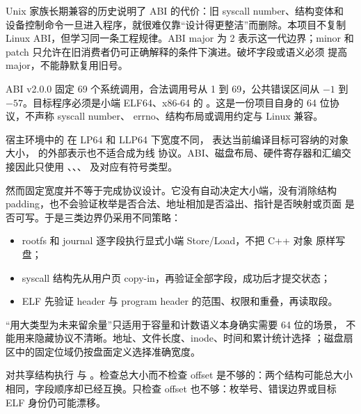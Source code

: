 Unix 家族长期兼容的历史说明了 ABI 的代价：旧 syscall number、结构变体和
设备控制命令一旦进入程序，就很难仅靠“设计得更整洁”而删除。本项目不复制
Linux ABI，但学习同一条工程规律。ABI major 为 2 表示这一代边界；minor
和 patch 只允许在旧消费者仍可正确解释的条件下演进。破坏字段或语义必须
提高 major，不能静默复用旧号。

\begin{contractbox}
ABI v2.0.0 固定 69 个系统调用，合法调用号从 1 到 69，公共错误区间从
\(-1\) 到 \(-57\)。目标程序必须是小端 ELF64、x86-64 的
。这是一份项目自身的 64 位协议，不声称 syscall number、
errno、结构布局或调用约定与 Linux 兼容。
\end{contractbox}

宿主环境中的  在 LP64 和 LLP64 下宽度不同，
表达当前编译目标可容纳的对象大小， 的外部表示也不适合成为线
协议。ABI、磁盘布局、硬件寄存器和汇编交接因此只使用
、、、
 及对应有符号类型。

然而固定宽度并不等于完成协议设计。它没有自动决定大小端，没有消除结构
padding，也不会验证枚举是否合法、地址相加是否溢出、指针是否映射或页面
是否可写。于是三类边界仍采用不同策略：

\begin{itemize}[leftmargin=2em]
  \item rootfs 和 journal 逐字段执行显式小端 Store/Load，不把 C++ 对象
        原样写盘；
  \item syscall 结构先从用户页 copy-in，再验证全部字段，成功后才提交状态；
  \item ELF 先验证 header 与 program header 的范围、权限和重叠，再读取段。
\end{itemize}

“用大类型为未来留余量”只适用于容量和计数语义本身确实需要 64 位的场景，
不能用来隐藏协议不清晰。地址、文件长度、inode、时间和累计统计选择
；磁盘扇区中的固定位域仍按盘面定义选择准确宽度。

 对共享结构执行
 与 。检查总大小而不检查 offset
是不够的：两个结构可能总大小相同，字段顺序却已经互换。只检查 offset
也不够：枚举号、错误边界或目标 ELF 身份仍可能漂移。

